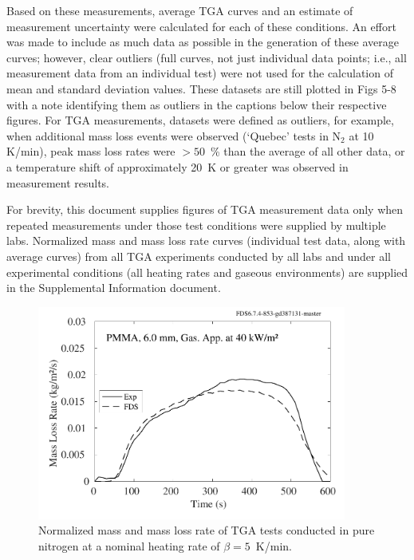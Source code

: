 \documentclass{book}
\begin{document}
Based on these measurements, average TGA curves and an estimate of measurement uncertainty were calculated for each of these conditions. An effort was made to include as much data as possible in the generation of these average curves; however, clear outliers (full curves, not just individual data points; i.e., all measurement data from an individual test) were not used for the calculation of mean and standard deviation values. These datasets are still plotted in Figs 5-8 with a note identifying them as outliers in the captions below their respective figures. For TGA measurements, datasets were defined as outliers, for example, when additional mass loss events were observed (‘Quebec’ tests in N$_2$ at 10 K/min), peak mass loss rates were $>50$~\% than the average of all other data, or a temperature shift of approximately 20~K or greater was observed in measurement results.

For brevity, this document supplies figures of TGA measurement data only when repeated measurements under those test conditions were supplied by multiple labs. Normalized mass and mass loss rate curves (individual test data, along with average curves) from all TGA experiments conducted by all labs and under all experimental conditions (all heating rates and gaseous environments) are supplied in the Supplemental Information document.

\begin{figure}
  \centering
  \includegraphics[width=4in]{SCRIPT_FIGURES/PMMA_40}
  \caption{Normalized mass and mass loss rate of TGA tests conducted in pure nitrogen at a nominal heating rate of $\beta=5$~K/min.}
  \label{Fig_5}
\end{figure}
\end{document}

